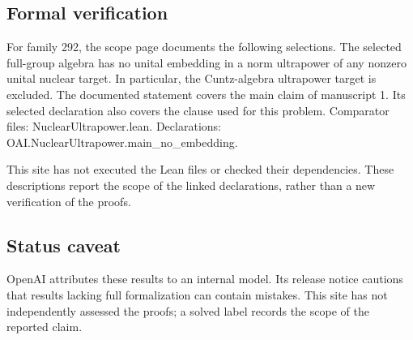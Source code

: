 \documentclass[11pt]{article}
\begin{document}
\subsection{Formal verification}
For family 292, the scope page documents the following selections. The selected full-group algebra has no unital embedding in a norm ultrapower of any nonzero unital nuclear target. In particular, the Cuntz-algebra ultrapower target is excluded. The documented statement covers the main claim of manuscript 1. Its selected declaration also covers the clause used for this problem. Comparator files: NuclearUltrapower.lean. Declarations: OAI.NuclearUltrapower.main\_no\_embedding.

This site has not executed the Lean files or checked their dependencies. These descriptions report the scope of the linked declarations, rather than a new verification of the proofs.

\subsection{Status caveat}
OpenAI attributes these results to an internal model. Its release notice cautions that results lacking full formalization can contain mistakes. This site has not independently assessed the proofs; a solved label records the scope of the reported claim.
\end{document}
